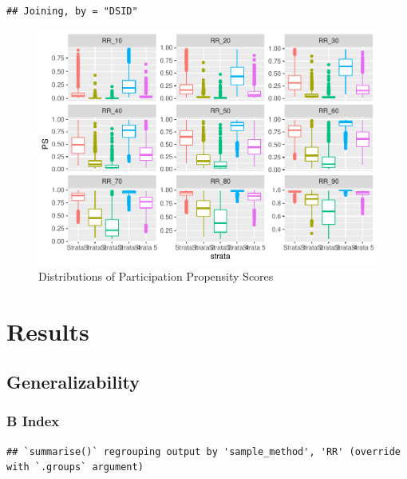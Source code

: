 \documentclass[
  english,
  man,floatsintext]{apa6}
\begin{document}
\begin{verbatim}
## Joining, by = "DSID"
\end{verbatim}

\begin{figure}
\centering
\includegraphics{5---Analysis_files/figure-latex/unnamed-chunk-13-3.pdf}
\caption{\label{fig:unnamed-chunk-13-3}Distributions of Participation Propensity Scores}
\end{figure}

\hypertarget{results}{%
\section{Results}\label{results}}

\hypertarget{generalizability}{%
\subsection{Generalizability}\label{generalizability}}

\hypertarget{b-index}{%
\subsubsection{B Index}\label{b-index}}

\begin{verbatim}
## `summarise()` regrouping output by 'sample_method', 'RR' (override with `.groups` argument)
\end{verbatim}
\end{document}
